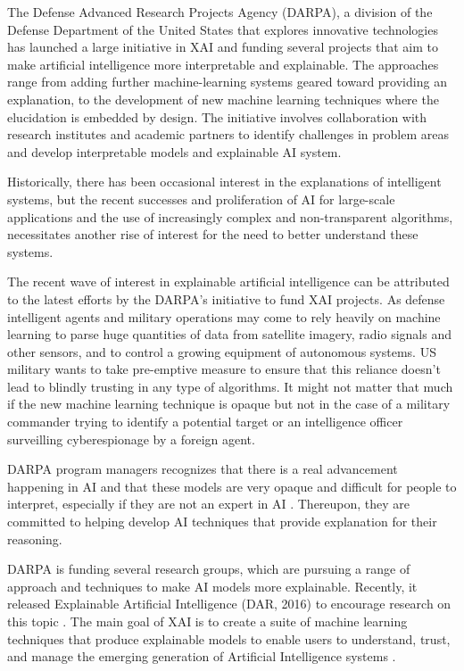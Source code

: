 The Defense Advanced Research Projects Agency (DARPA), a division of the Defense Department of the United States that explores innovative technologies has launched a large initiative in XAI and funding several projects that aim to make artificial intelligence more interpretable and explainable. The approaches range from adding further machine-learning systems geared toward providing an explanation, to the development of new machine learning techniques where the elucidation is embedded by design. The initiative involves collaboration with research institutes and academic partners to identify challenges in problem areas and develop interpretable models and explainable AI system.

Historically, there has been occasional interest in the explanations of intelligent systems\cite{Abdul}, but the recent successes and proliferation of AI for large-scale applications and the use of increasingly complex and non-transparent algorithms, necessitates another rise of interest for the need to better understand these systems.

The recent wave of interest in explainable artificial intelligence can be attributed to the latest efforts by the DARPA's initiative to fund XAI projects. As defense intelligent agents and military operations may come to rely heavily on machine learning to parse huge quantities of data from satellite imagery, radio signals and other sensors, and to control a growing equipment of autonomous systems. US military wants to take pre-emptive measure to ensure that this reliance doesn’t lead to blindly trusting in any type of algorithms. It might not matter that much if the new machine learning technique is opaque but not in the case of a military commander trying to identify a potential target \cite{Knight2017} or an intelligence officer surveilling cyberespionage by a foreign agent.

DARPA program managers recognizes that there is a real advancement happening in AI and that these models are very opaque and difficult for people to interpret, especially if they are not an expert in AI \cite{Knight2017}. Thereupon, they are committed to helping develop AI techniques that provide explanation for their reasoning.

DARPA is funding several research groups, which are pursuing a range of approach and techniques to make AI models more explainable. Recently, it released Explainable Artificial Intelligence (DAR, 2016) to encourage research on this topic \cite{Gunning}. The main goal of XAI is to create a suite of machine learning techniques that produce explainable models to enable users to understand, trust, and manage the emerging generation of Artificial Intelligence systems \cite{Gunning2}.

